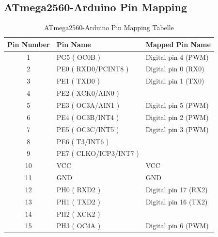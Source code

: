 \begin{appendix}
 
\newpage

\section{ATmega2560-Arduino Pin Mapping}
\label{sec:pinMapping}
\begin{table}[h]
  \centering
  \caption{ATmega2560-Arduino Pin Mapping Tabelle \cite{ArduinoPinMapping2018}}
    \begin{tabular}{|c|p{15.855em}|p{11.43em}|}
    \hline
    \multicolumn{1}{|p{7.07em}|}{\textbf{Pin Number}} & \textbf{Pin Name} & \textbf{Mapped Pin Name} \\
    \hline
    1     & PG5 ( OC0B ) & Digital pin 4 (PWM) \\
    \hline
    2     & PE0 ( RXD0/PCINT8 ) & Digital pin 0 (RX0) \\
    \hline
    3     & PE1 ( TXD0 ) & Digital pin 1 (TX0) \\
    \hline
    4     & PE2 ( XCK0/AIN0 ) & \multicolumn{1}{l|}{} \\
    \hline
    5     & PE3 ( OC3A/AIN1 ) & Digital pin 5 (PWM) \\
    \hline
    6     & PE4 ( OC3B/INT4 ) & Digital pin 2 (PWM) \\
    \hline
    7     & PE5 ( OC3C/INT5 ) & Digital pin 3 (PWM) \\
    \hline
    8     & PE6 ( T3/INT6 ) & \multicolumn{1}{l|}{} \\
    \hline
    9     & PE7 ( CLKO/ICP3/INT7 ) & \multicolumn{1}{l|}{} \\
    \hline
    10    & VCC   & VCC \\
    \hline
    11    & GND   & GND \\
    \hline
    12    & PH0 ( RXD2 ) & Digital pin 17 (RX2) \\
    \hline
    13    & PH1 ( TXD2 ) & Digital pin 16 (TX2) \\
    \hline
    14    & PH2 ( XCK2 ) & \multicolumn{1}{l|}{} \\
    \hline
    15    & PH3 ( OC4A ) & Digital pin 6 (PWM) \\
    \hline

\end{tabular}
\end{table}
\end{appendix}
